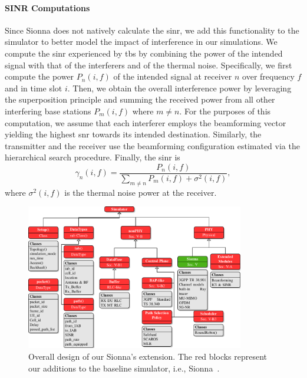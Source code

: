 \paragraph{SINR Computations}

Since Sionna does not natively calculate the \gls{sinr}, we add this functionality to the simulator to better model the impact of interference in our simulations. We compute the \gls{sinr} experienced by \glspl{tb} by combining the power of the intended signal with that of the interferers and of the thermal noise. Specifically, we first compute the power $P_{n}(i,f)$ of the intended signal at receiver $n$ over frequency $f$ and in time slot $i$. Then, we obtain the overall interference power by leveraging the superposition principle and summing the received power from all other interfering base stations $P_{m} (i, f)$ where $m \neq n$. For the purposes of this computation, we assume that each interferer employs the beamforming vector yielding the highest \gls{snr} towards its intended destination. Similarly, the transmitter and the receiver use the beamforming configuration estimated via the hierarchical search procedure. Finally, the \gls{sinr} is 
\begin{equation}
    \label{EQ_CGAN1}
    \gamma_{n} (i, f)= \frac{P_{n}(i,f)}{\sum\limits_{m \neq n} P_{m}(i,f) + \sigma^2(i,f)} ,
\end{equation}
where $\sigma^2(i,f)$ is the thermal noise power at the receiver.

\begin{figure}
\centering
\includegraphics[width=0.85\textwidth]{Figures/Safehaul/simulator_diagram.pdf}
\caption{Overall design of our Sionna's extension. The red blocks represent our additions to the baseline simulator, i.e., Sionna~\cite{hoydis2022sionna}.}
\label{fig:simulator_design}
\end{figure}

